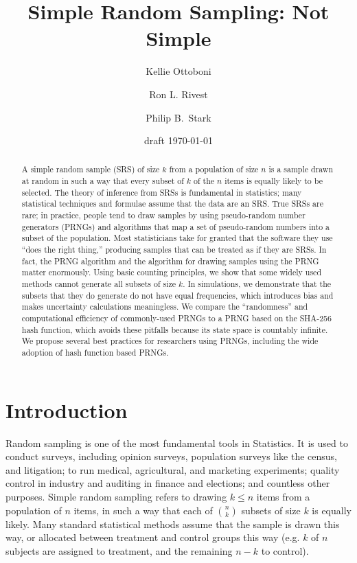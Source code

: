 \documentclass[12pt]{article}
\begin{document}
\title{Simple Random Sampling: Not Simple}
\author{Kellie Ottoboni
\and
Ron L. Rivest
\and
Philip B.~Stark 
}

\date{draft \today}




\maketitle

\begin{abstract}
\small
A simple random sample (SRS) of size $k$ from a population of size $n$ is a sample drawn 
at random in such a way that every subset of $k$ of the $n$ items is equally likely to be selected. 
The theory of inference from SRSs is fundamental in statistics;
many statistical techniques and formulae assume that the data are an SRS.
True SRSs are rare; in practice, people tend to draw samples by using pseudo-random number generators 
(PRNGs) and algorithms that map a set of pseudo-random numbers into a subset of the population. 
Most statisticians take for granted that the software they use ``does the right thing,''
producing samples that can be treated as if they are SRSs.
In fact, the PRNG algorithm and the algorithm for drawing samples using the PRNG matter
enormously.
Using basic counting principles, we show that some widely used methods cannot generate all subsets of size $k$.
In simulations, we demonstrate that the subsets that they do generate do not have equal frequencies, which
introduces bias and makes uncertainty calculations meaningless.
We compare the ``randomness'' and computational efficiency of commonly-used PRNGs to a PRNG 
based on the SHA-256 hash function, which avoids these pitfalls because its state space is countably infinite.
We propose several best practices for researchers using PRNGs, including the wide adoption of hash function based PRNGs.
\end{abstract}


\newpage
\tableofcontents
\newpage 

\section{Introduction}
Random sampling is one of the most fundamental tools in Statistics.
It is used to conduct surveys, including opinion surveys, population surveys like the census, and litigation; 
to run medical, agricultural, and marketing experiments; 
quality control in industry and auditing in finance and elections;
and countless other purposes.
Simple random sampling refers to drawing $k \leq n$ items from a population of $n$ items,
in such a way that each of ${n \choose k}$ subsets of size $k$ is equally likely.
Many standard statistical methods assume that the sample is drawn this way, 
or allocated between treatment and control groups this way
(e.g. $k$ of $n$ subjects are assigned to treatment, and the remaining $n-k$ to control).
\end{document}
